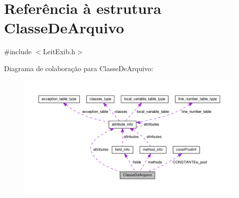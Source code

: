 \hypertarget{struct_classe_de_arquivo}{\section{Referência à estrutura Classe\-De\-Arquivo}
\label{struct_classe_de_arquivo}
}


{\ttfamily \#include $<$Leit\-Exib.\-h$>$}



Diagrama de colaboração para Classe\-De\-Arquivo\-:\nopagebreak
\begin{figure}[H]
\begin{center}
\leavevmode
\includegraphics[width=350pt]{struct_classe_de_arquivo__coll__graph}
\end{center}
\end{figure}
